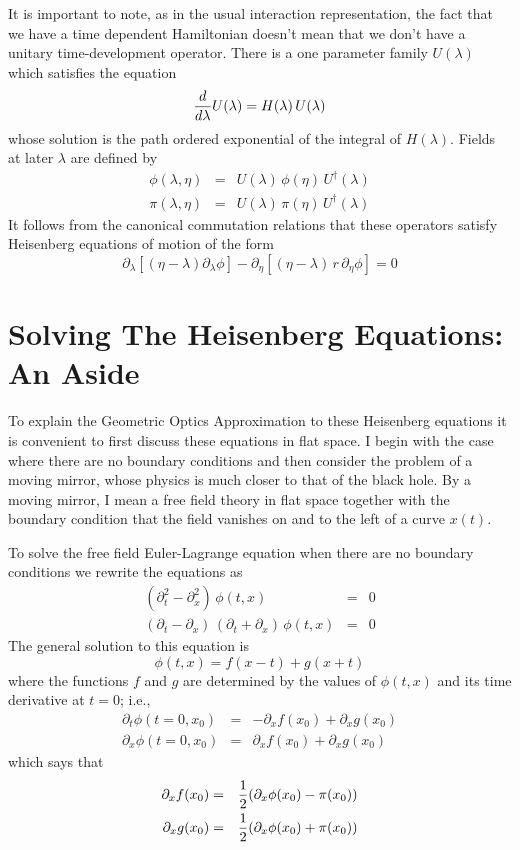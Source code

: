 \documentclass[12pt]{article}
\begin{document}
It is important to note, as in the usual interaction representation,
the fact that we have a time
dependent Hamiltonian doesn't mean that we don't have a unitary time-development
operator.  There is a one parameter family $U(\lambda)$ which satisfies the equation
\begin{equation}
     {d \over d\lambda} U(\lambda) = H(\lambda)\,U(\lambda)
\end{equation}
whose solution is the path ordered exponential of the integral of $H(\lambda)$.
Fields at later $\lambda$ are defined by
\begin{eqnarray}
\phi(\lambda,\eta) &=& U(\lambda)\, \phi(\eta) \,U^{\dagger}(\lambda) \\
\pi(\lambda,\eta)  &=& U(\lambda) \, \pi(\eta) \, U^{\dagger}(\lambda) 
\end{eqnarray}
It follows from the canonical commutation relations that
these operators satisfy Heisenberg equations of motion of the form
\begin{equation}
\partial_{\lambda} \left[ (\eta - \lambda) \partial_{\lambda}\phi \right]
-\partial_{\eta}\left[ (\eta - \lambda)\,r\,\partial_{\eta}\phi \right] = 0
\end{equation}

\section{Solving The Heisenberg Equations: An Aside}

To explain the Geometric Optics Approximation
to these Heisenberg equations it is convenient
to first discuss these equations in flat space.
I begin with the case where there are no boundary conditions and then
consider the problem of a moving mirror, whose physics is much
closer to that of the black hole.  By a moving mirror, I mean
a free field theory in flat space together with the boundary 
condition that the field vanishes on and to the left of a curve $x(t)$.

To solve the free field Euler-Lagrange equation when there are no boundary conditions
we rewrite the equations as
\begin{eqnarray}
(\partial_t^2 - \partial_x^2 )\,\phi(t,x) &=& 0 \nonumber \\
(\partial_t - \partial_x)\,(\partial_t + \partial_x)\,\phi(t,x) &=& 0
\end{eqnarray}
The general solution to this equation is 
\begin{equation}
\phi(t,x) = f(x-t) + g(x+t)
\end{equation}
where the functions $f$ and $g$ are determined by the values of $\phi(t,x)$ and
its time derivative at $t=0$; i.e.,
\begin{eqnarray}
\partial_t \phi(t=0,x_0) &=& - \partial_x f(x_0) + \partial_x g(x_0) \nonumber \\
\partial_x \phi(t=0,x_0) &=& \partial_x f(x_0) + \partial_x g(x_0)
\end{eqnarray} 
which says that 
\begin{eqnarray}
\partial_x f(x_0) &=& {1\over 2} (\partial_x\phi(x_0) - \pi(x_0)) \nonumber \\
\partial_x g(x_0) &=& {1\over 2} (\partial_x\phi(x_0) + \pi(x_0)) 
\end{eqnarray}
\end{document}
